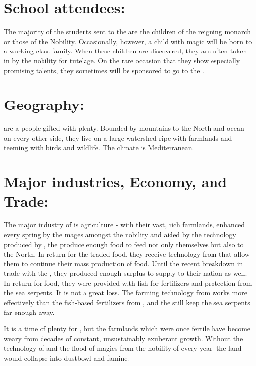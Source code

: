 \documentclass[blue]{GL2020}
\begin{document}
\section*{School attendees:}

The majority of the students sent to the \pSchool{} are the children of the reigning monarch or those of the Nobility. Occasionally, however, a child with magic will be born to a working class family.  When these children are discovered, they are often taken in by the nobility for tutelage.  On the rare occasion that they show especially promising talents, they sometimes will be sponsored to go to the \pSchool{}.

\section*{Geography:}

\pFarmers{} are a people gifted with plenty.  Bounded by mountains to the North and ocean on every other side, they live on a large watershed ripe with farmlands and teeming with birds and wildlife.  The climate is Mediterranean.

\section*{Major industries, Economy, and Trade:}

The major industry of \pFarm{} is agriculture - with their vast, rich farmlands, enhanced every spring by the mages amongst the nobility and aided by the technology produced by \pTech{}, the \pFarmers{} produce enough food to feed not only themselves but also \pTech{} to the North.  In return for the traded food, they receive technology from \pTech{} that allow them to continue their mass production of food.  Until the recent breakdown in trade with the \pShippies{}, they produced enough surplus to supply to their nation as well.  In return for food, they were provided with fish for fertilizers and protection from the sea serpents.  It is not a great loss.  The farming technology from \pTech{} works more effectively than the fish-based fertilizers from \pShip{}, and the \pShippies{} still keep the sea serpents far enough away.

It is a time of plenty for \pFarmers{}, but the farmlands which were once fertile have become weary from decades of constant, unsustainably exuberant growth.  Without the technology of \pTech{} and the flood of magics from the nobility of \pFarm{} every year, the land would collapse into dustbowl and famine.
\end{document}
